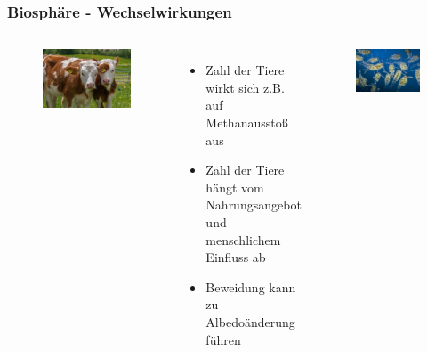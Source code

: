 \begin{frame}
	\frametitle{Biosphäre - Wechselwirkungen}
	\begin{columns}
		\begin{figure}
			\centering
			\includegraphics[trim={0cm 0cm 0cm 0.1cm}, clip,width=\linewidth]{bilder/kuehe}
		\end{figure}
			\begin{itemize}
				\item Zahl der Tiere wirkt sich z.B. auf Methanausstoß aus
				\item Zahl der Tiere hängt vom Nahrungsangebot und menschlichem Einfluss ab
				\item Beweidung kann zu Albedoänderung führen
			\end{itemize}
		\begin{figure}
			\centering
			\includegraphics[width=\linewidth]{bilder/plankton}

\end{figure}
\end{columns}
\end{frame}
